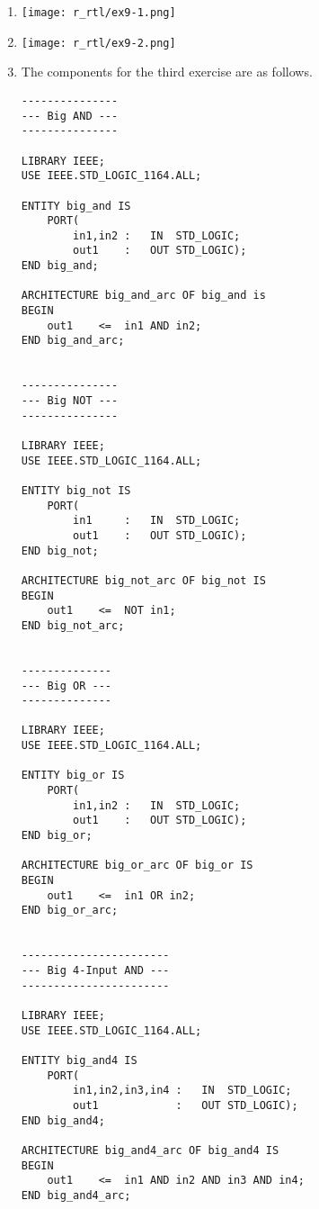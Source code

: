 \begin{enumerate}
	\item 
	\begin{minipage}[t]{1\linewidth}
		\vspace{0pt}\raggedright
		\centering
		\texttt{[image: r\_rtl/ex9-1.png]}
	\end{minipage}

\item 
\begin{minipage}[t]{1\linewidth}
	\vspace{0pt}\raggedright
	\centering
	\texttt{[image: r\_rtl/ex9-2.png]}
\end{minipage}
\item The components for the third exercise are as follows.
\begin{lstlisting}
---------------
--- Big AND ---
---------------

LIBRARY IEEE;
USE IEEE.STD_LOGIC_1164.ALL;

ENTITY big_and IS
	PORT(
		in1,in2	:	IN	STD_LOGIC;
		out1	:	OUT	STD_LOGIC);
END big_and;

ARCHITECTURE big_and_arc OF big_and is
BEGIN
	out1	<=	in1 AND in2;
END big_and_arc;


---------------
--- Big NOT ---
---------------

LIBRARY IEEE;
USE IEEE.STD_LOGIC_1164.ALL;

ENTITY big_not IS
	PORT(
		in1		:	IN	STD_LOGIC;
		out1	:	OUT	STD_LOGIC);
END big_not;

ARCHITECTURE big_not_arc OF big_not IS
BEGIN
	out1	<=	NOT in1;
END big_not_arc;


--------------
--- Big OR ---
--------------

LIBRARY IEEE;
USE IEEE.STD_LOGIC_1164.ALL;

ENTITY big_or IS
	PORT(
		in1,in2	:	IN	STD_LOGIC;
		out1	:	OUT	STD_LOGIC);
END big_or;

ARCHITECTURE big_or_arc OF big_or IS
BEGIN
	out1	<=	in1 OR in2;
END big_or_arc;


-----------------------
--- Big 4-Input AND ---
-----------------------

LIBRARY IEEE;
USE IEEE.STD_LOGIC_1164.ALL;

ENTITY big_and4 IS
	PORT(
		in1,in2,in3,in4	:	IN	STD_LOGIC;
		out1			:	OUT	STD_LOGIC);
END big_and4;

ARCHITECTURE big_and4_arc OF big_and4 IS
BEGIN
	out1	<=	in1 AND in2 AND in3 AND in4;
END big_and4_arc;



\end{lstlisting}
\end{enumerate}
